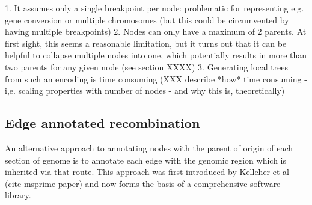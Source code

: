 \documentclass{article}
\begin{document}
1. It assumes only a single breakpoint per node: problematic for representing e.g. gene conversion or
multiple chromosomes (but this could be circumvented by having multiple breakpoints)
2. Nodes can only have a maximum of 2 parents. At first sight, this seems a reasonable limitation,
but it turns out that it can be helpful to collapse multiple nodes into one, which potentially results
in more than two parents for any given node (see section XXXX)
3. Generating local trees from such an encoding is time consuming (XXX describe *how* time consuming - i,e. scaling properties with number of nodes - and why this is, theoretically)

\subsection*{Edge annotated recombination}

An alternative approach to annotating nodes with the parent of origin of each section of genome is
to annotate each edge with the genomic region which is inherited via that route. This approach
was first introduced by Kelleher et al (cite msprime paper) and now forms the basis of a comprehensive
software library.






\end{document}
